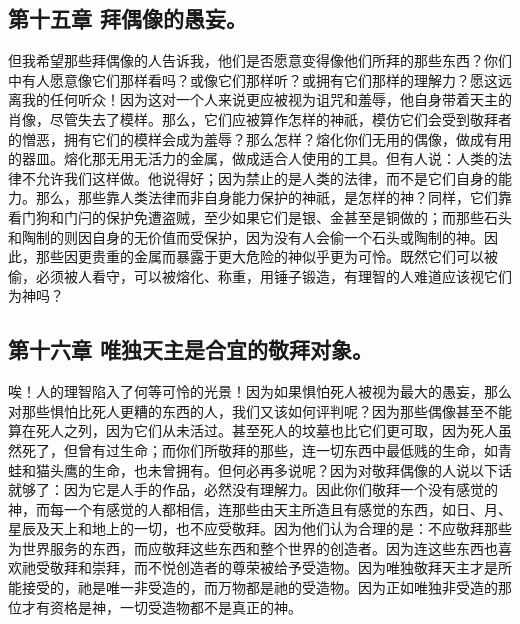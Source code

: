 
\subsection{第十五章 拜偶像的愚妄。}

但我希望那些拜偶像的人告诉我，他们是否愿意变得像他们所拜的那些东西？你们中有人愿意像它们那样看吗？或像它们那样听？或拥有它们那样的理解力？愿这远离我的任何听众！因为这对一个人来说更应被视为诅咒和羞辱，他自身带着天主的肖像，尽管失去了模样。那么，它们应被算作怎样的神祇，模仿它们会受到敬拜者的憎恶，拥有它们的模样会成为羞辱？那么怎样？熔化你们无用的偶像，做成有用的器皿。熔化那无用无活力的金属，做成适合人使用的工具。但有人说：人类的法律不允许我们这样做。他说得好；因为禁止的是人类的法律，而不是它们自身的能力。那么，那些靠人类法律而非自身能力保护的神祇，是怎样的神？同样，它们靠看门狗和门闩的保护免遭盗贼，至少如果它们是银、金甚至是铜做的；而那些石头和陶制的则因自身的无价值而受保护，因为没有人会偷一个石头或陶制的神。因此，那些因更贵重的金属而暴露于更大危险的神似乎更为可怜。既然它们可以被偷，必须被人看守，可以被熔化、称重，用锤子锻造，有理智的人难道应该视它们为神吗？\par


\subsection{第十六章 唯独天主是合宜的敬拜对象。}

唉！人的理智陷入了何等可怜的光景！因为如果惧怕死人被视为最大的愚妄，那么对那些惧怕比死人更糟的东西的人，我们又该如何评判呢？因为那些偶像甚至不能算在死人之列，因为它们从未活过。甚至死人的坟墓也比它们更可取，因为死人虽然死了，但曾有过生命；而你们所敬拜的那些，连一切东西中最低贱的生命，如青蛙和猫头鹰的生命，也未曾拥有。但何必再多说呢？因为对敬拜偶像的人说以下话就够了：因为它是人手的作品，必然没有理解力。因此你们敬拜一个没有感觉的神，而每一个有感觉的人都相信，连那些由天主所造且有感觉的东西，如日、月、星辰及天上和地上的一切，也不应受敬拜。因为他们认为合理的是：不应敬拜那些为世界服务的东西，而应敬拜这些东西和整个世界的创造者。因为连这些东西也喜欢祂受敬拜和崇拜，而不悦创造者的尊荣被给予受造物。因为唯独敬拜天主才是所能接受的，祂是唯一非受造的，而万物都是祂的受造物。因为正如唯独非受造的那位才有资格是神，一切受造物都不是真正的神。\par


